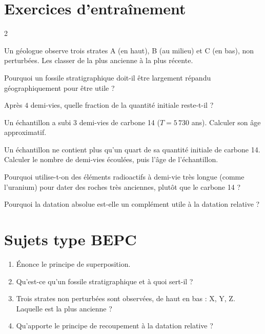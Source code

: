 \section{Exercices d'entraînement}
\begin{multicols}{2}

\exo{} Un géologue observe trois strates A (en haut), B (au milieu) et C (en
bas), non perturbées. Les classer de la plus ancienne à la plus récente.

\exo{} Pourquoi un fossile stratigraphique doit-il être largement répandu
géographiquement pour être utile ?

\exo{} Après $4$ demi-vies, quelle fraction de la quantité initiale reste-t-il ?

\exo{} Un échantillon a subi $3$ demi-vies de carbone 14 ($T=5\,730$ ans).
Calculer son âge approximatif.

\exo{} Un échantillon ne contient plus qu'un quart de sa quantité initiale de
carbone 14. Calculer le nombre de demi-vies écoulées, puis l'âge de l'échantillon.

\exo{} Pourquoi utilise-t-on des éléments radioactifs à demi-vie très longue
(comme l'uranium) pour dater des roches très anciennes, plutôt que le carbone 14 ?

\exo{} Pourquoi la datation absolue est-elle un complément utile à la datation
relative ?

\end{multicols}

\section{Sujets type BEPC}

\begin{enumerate}[label=\arabic*)]
\item Énonce le principe de superposition.
\item Qu'est-ce qu'un fossile stratigraphique et à quoi sert-il ?
\item Trois strates non perturbées sont observées, de haut en bas : X, Y, Z. Laquelle
est la plus ancienne ?
\item Qu'apporte le principe de recoupement à la datation relative ?
\end{enumerate}

